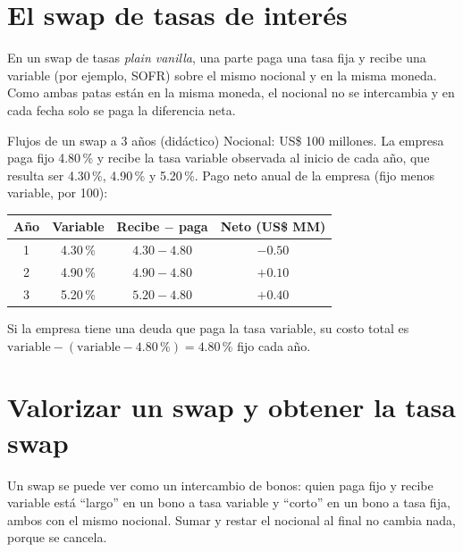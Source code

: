 \section{El swap de tasas de interés}

En un swap de tasas \emph{plain vanilla}, una parte paga una tasa fija y recibe una variable (por ejemplo, SOFR) sobre el mismo nocional y en la misma moneda. Como ambas patas están en la misma moneda, el nocional no se intercambia y en cada fecha solo se paga la diferencia neta.

\begin{ejemplo}{Flujos de un swap a 3 años (didáctico)}
Nocional: US\$ 100 millones. La empresa paga fijo 4.80\,\% y recibe la tasa variable observada al inicio de cada año, que resulta ser 4.30\,\%, 4.90\,\% y 5.20\,\%. Pago neto anual de la empresa (fijo menos variable, por 100):
\begin{center}\small
\begin{tabular}{@{}cccc@{}}
\toprule
Año & Variable & Recibe $-$ paga & Neto (US\$ MM)\\
\midrule
1 & 4.30\,\% & $4.30-4.80$ & $-0.50$\\
2 & 4.90\,\% & $4.90-4.80$ & $+0.10$\\
3 & 5.20\,\% & $5.20-4.80$ & $+0.40$\\
\bottomrule
\end{tabular}
\end{center}
Si la empresa tiene una deuda que paga la tasa variable, su costo total es $\text{variable}-(\text{variable}-4.80\,\%)=4.80\,\%$ fijo cada año.
\end{ejemplo}

\section{Valorizar un swap y obtener la tasa swap}

Un swap se puede ver como un intercambio de bonos: quien paga fijo y recibe variable está \enquote{largo} en un bono a tasa variable y \enquote{corto} en un bono a tasa fija, ambos con el mismo nocional. Sumar y restar el nocional al final no cambia nada, porque se cancela.

